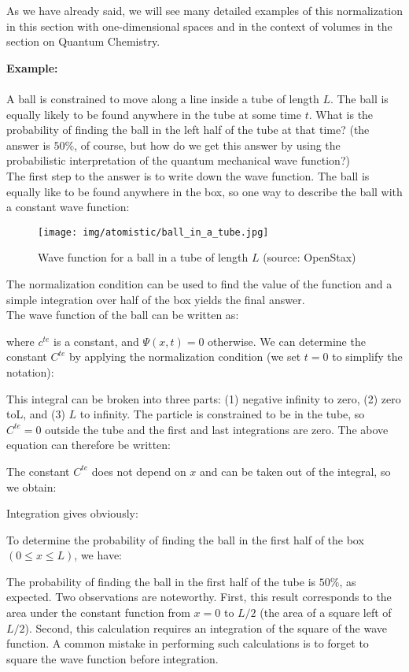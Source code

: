 	As we have already said, we will see many detailed examples of this normalization in this section with one-dimensional spaces and in the context of volumes in the section on Quantum Chemistry.
	 \begin{tcolorbox}[colframe=black,colback=white,sharp corners]
	\textbf{{\Large {}}Example:}\\\\
	A ball is constrained to move along a line inside a tube of length $L$. The ball is equally likely to be found anywhere in the tube at some time $t$. What is the probability of finding the ball in the left half of the tube at that time? (the answer is $50\%$, of course, but how do we get this answer by using the probabilistic interpretation of the quantum mechanical wave function?)\\
	
	The first step to the answer is to write down the wave function. The ball is equally like to be found anywhere in the box, so one way to describe the ball with a constant wave function:
	\begin{figure}[H]
		\centering
		\texttt{[image: img/atomistic/ball\_in\_a\_tube.jpg]}	
		\caption[Wave function for a ball in a tube of length $L$]{Wave function for a ball in a tube of length $L$ (source: OpenStax)}
	\end{figure}
	The normalization condition can be used to find the value of the function and a simple integration over half of the box yields the final answer.\\
	
	The wave function of the ball can be written as:
	
	where $c^{te}$ is a constant, and  $\Psi(x,t)=0$ otherwise. We can determine the constant $C^{te}$ by applying the normalization condition (we set  $t=0$  to simplify the notation):
	
	This integral can be broken into three parts: (1) negative infinity to zero, (2) zero to$ $L, and (3) $L$ to infinity. The particle is constrained to be in the tube, so $C^{te}=0$ outside the tube and the first and last integrations are zero. The above equation can therefore be written:
	
	\end{tcolorbox}
	
	\begin{tcolorbox}[colframe=black,colback=white,sharp corners]
	The constant $C^{te}$ does not depend on $x$ and can be taken out of the integral, so we obtain:
	
	Integration gives obviously:
	
	To determine the probability of finding the ball in the first half of the box $( 0\le x\le L)$, we have:
	
	The probability of finding the ball in the first half of the tube is $50\%$, as expected. Two observations are noteworthy. First, this result corresponds to the area under the constant function from $x=0$ to $L/2$ (the area of a square left of $L/2$). Second, this calculation requires an integration of the square of the wave function. A common mistake in performing such calculations is to forget to square the wave function before integration.
	\end{tcolorbox}
	
